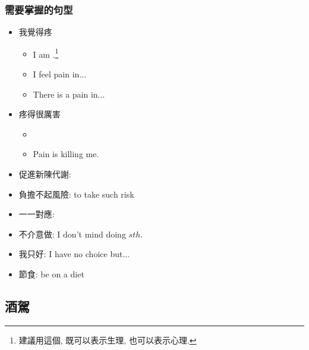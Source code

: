 \subsubsection*{需要掌握的句型}
\begin{multicols}{2}
\begin{itemize}
  \itemsep0em
  \item 我覺得疼
  \begin{itemize}
  \itemsep0em
  	\item I am .\footnote{建議用這個, 既可以表示生理, 也可以表示心理.}
  	\item I feel pain in...
  	\item There is a pain in...
  \end{itemize}
  \item 疼得很厲害
  \begin{itemize}
  \itemsep0em
  	\item {}
  	\item Pain is killing me.
  \end{itemize}
  \item 促進新陳代謝: 
  \item 負擔不起風險:  to take such risk
  \item 一一對應: 
  \item 不介意做: I don't mind doing $sth.$
  \item 我只好: I have no choice but...
  \item 節食: be on a diet
\end{itemize}
\end{multicols}

\subsection{酒駕}
